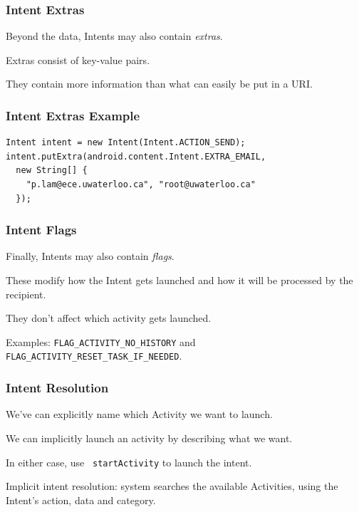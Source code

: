 \begin{frame}
\frametitle{Intent Extras}
\begin{changemargin}{1cm}

Beyond the data, Intents may also contain \emph{extras}. 

Extras
consist of key-value pairs. 

They contain more information than what
can easily be put in a URI.

\end{changemargin}
\end{frame}


\begin{frame}[fragile]
\frametitle{Intent Extras Example}
\begin{changemargin}{1cm}

{\small 
\begin{verbatim}
Intent intent = new Intent(Intent.ACTION_SEND);
intent.putExtra(android.content.Intent.EXTRA_EMAIL,
  new String[] {
    "p.lam@ece.uwaterloo.ca", "root@uwaterloo.ca"
  });
\end{verbatim}
}


\end{changemargin}
\end{frame}



\begin{frame}
\frametitle{Intent Flags}
\begin{changemargin}{1cm}

Finally, Intents may also contain \emph{flags}.

These modify how the
Intent gets launched and how it will be processed by the recipient. 


They don't affect which activity gets launched. 

Examples: {\tt FLAG\_ACTIVITY\_NO\_HISTORY} and 
{\tt FLAG\_ACTIVITY\_RESET\_TASK\_IF\_NEEDED}.

\end{changemargin}
\end{frame}


\begin{frame}
\frametitle{Intent Resolution}
\begin{changemargin}{1cm}
We've can explicitly name which Activity we want to launch.

We can implicitly launch an activity by
describing what we want. 

In either case, use {\tt
  startActivity}  to launch the intent.

Implicit intent resolution: system searches the
available Activities, using the Intent's action, data
and category.

\end{changemargin}
\end{frame}

